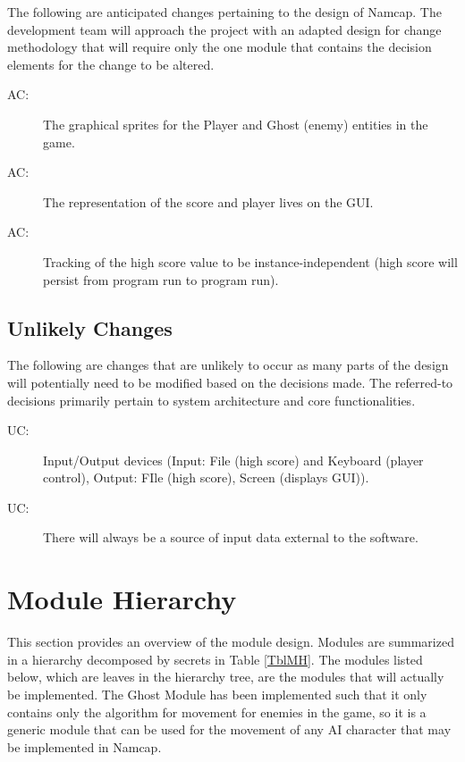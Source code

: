 \documentclass[12pt, titlepage]{article}
\newcounter{acnum}
\newcommand{\actheacnum}{AC\theacnum}
\newcounter{ucnum}
\newcommand{\uctheucnum}{UC\theucnum}
\begin{document}
The following are anticipated changes pertaining to the design of Namcap. The development team will approach the project with an adapted design for change methodology that will require only the one module that contains the decision elements for the change to be altered.

\begin{description}
\item[ \actheacnum \label{acSprites}:] The graphical sprites for the Player and Ghost (enemy) entities in the game.
\item[ \actheacnum \label{acStats}:] The representation of the score and player lives on the GUI.
\item[ \actheacnum \label{acHScore}:] Tracking of the high score value to be instance-independent (high score will persist from program run to program run).
\end{description}

\subsection{Unlikely Changes} \label{SecUchange}

The following are changes that are unlikely to occur as many parts of the design will potentially need to be modified based on the decisions made. The referred-to decisions primarily pertain to system architecture and core functionalities.

\begin{description}
\item[ \uctheucnum \label{ucIO}:] Input/Output devices (Input: File (high score) and Keyboard (player control), Output: FIle (high score), Screen (displays GUI)).
\item[ \uctheucnum \label{ucInput}:] There will always be a source of input data external to the software.
\end{description}

\section{Module Hierarchy} \label{SecMH}

This section provides an overview of the module design. Modules are summarized
in a hierarchy decomposed by secrets in Table \ref{TblMH}. The modules listed
below, which are leaves in the hierarchy tree, are the modules that will
actually be implemented. The Ghost Module has been implemented such that it only
contains only the algorithm for movement for enemies in the game, so it is a generic
module that can be used for the movement of any AI character that may be
implemented in Namcap.
\end{document}
